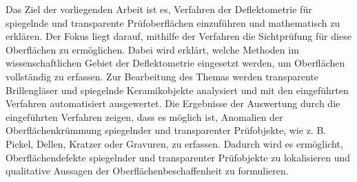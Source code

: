 \noindent
Das Ziel der vorliegenden Arbeit ist es, Verfahren der Deflektometrie für spiegelnde und transparente Prüfoberflächen einzuführen und mathematisch zu erklären.
Der Fokus liegt darauf, mithilfe der Verfahren die Sichtprüfung für diese Oberflächen zu ermöglichen.
Dabei wird erklärt, welche Methoden im wissenschaftlichen Gebiet der Deflektometrie eingesetzt werden, um Oberflächen vollständig zu erfassen.
Zur Bearbeitung des Themas werden transparente Brillengläser und spiegelnde Keramikobjekte analysiert und mit den eingeführten Verfahren automatisiert ausgewertet.
Die Ergebnisse der Auswertung durch die eingeführten Verfahren zeigen, dass es möglich ist, Anomalien der Oberflächenkrümmung spiegelnder und transparenter Prüfobjekte, wie z. B. Pickel, Dellen, Kratzer oder Gravuren, zu erfassen.
Dadurch wird es ermöglicht, Oberflächendefekte spiegelnder und transparenter Prüfobjekte zu lokalisieren und qualitative Aussagen der Oberflächenbeschaffenheit zu formulieren.